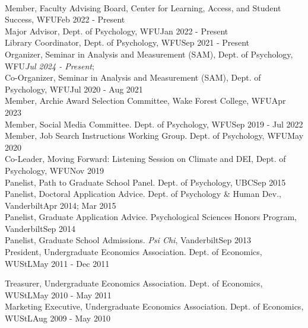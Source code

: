 \smallskip\\
Member, Faculty Advising Board, Center for Learning, Access, and Student Success, WFU\hfill {Feb 2022 - Present}\\
Major Advisor, Dept. of Psychology, WFU\hfill{Jan 2022 - Present}\\
Library Coordinator, Dept. of Psychology, WFU\hfill {Sep 2021 - Present}\\
Organizer, Seminar in Analysis and Measurement (SAM), Dept. of Psychology, WFU\hfill{\textit{Jul 2024 - Present};}\newline 
{}\smallskip\\
Co-Organizer, Seminar in Analysis and Measurement (SAM), Dept. of Psychology, WFU\hfill {Jul 2020 - Aug 2021}\\
Member, Archie Award Selection Committee, Wake Forest College, WFU\hfill{Apr 2023}\\ 
Member, Social Media Committee. Dept. of Psychology, WFU\hfill {Sep 2019 - Jul 2022}\\
Member, Job Search Instructions Working Group. Dept. of Psychology, WFU\hfill{May 2020}\\
Co-Leader, Moving Forward: Listening Session on Climate and DEI, Dept. of Psychology, WFU\hfill {Nov 2019}\\
Panelist, Path to Graduate School Panel. Dept. of Psychology, UBC\hfill {Sep 2015}\\
Panelist, Doctoral Application Advice. Dept. of Psychology \& Human Dev., Vanderbilt\hfill {Apr 2014; Mar 2015}\\
Panelist, Graduate Application Advice. Psychological Sciences Honors Program, Vanderbilt\hfill {Sep 2014}\\
Panelist, Graduate School Admissions. \textit{Psi Chi}, Vanderbilt\hfill{Sep 2013}\\
President, Undergraduate Economics Association. Dept. of Economics, WUStL\hfill{May 2011 - Dec 2011}\\
\begin{minipage}{\linewidth}\vspace{1.1mm} Treasurer, Undergraduate Economics Association. Dept. of Economics, WUStL\hfill{May 2010 - May 2011}\\
Marketing Executive, Undergraduate Economics Association. Dept. of Economics, WUStL\hfill {Aug 2009 - May 2010}\end{minipage}\medskip\\
